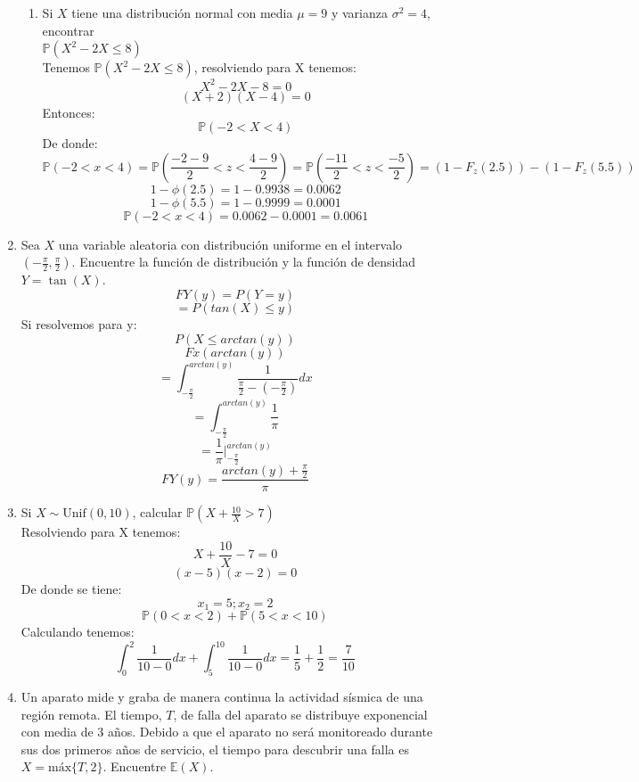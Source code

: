 \documentclass[11pt,a4paper]{report}
\begin{document}
\begin{enumerate}
{\begin{enumerate}
				\item {
					Si $X$ tiene una distribución normal con media $\mu = 9$ y
					varianza $\sigma^2 = 4$, encontrar \\
					$\mathbb{P}(X^2 - 2X \leq 8)$\\
					Tenemos $\mathbb{P}(X^2 - 2X \leq 8)$, resolviendo para X tenemos:
					\[X^2 - 2X - 8 = 0\]
					\[(X + 2) (X - 4) = 0\]
					Entonces:
					\[\mathbb{P}(-2 < X < 4) \]
					De donde:
					\[ \mathbb{P}(-2 < x < 4) = \mathbb{P}(\frac{-2-9}{2} < z < \frac{4-9}{2}) =\mathbb{P}(\frac{-11}{2} < z < \frac{-5}{2}) =  (1 - F_z(2.5)) - (1 - F_z(5.5))\]
					\[  1 - \phi(2.5) = 1 - 0.9938 = 0.0062\]
					\[ 1 - \phi(5.5) = 1 - 0.9999 = 0.0001 \]
					\[\mathbb{P}(-2 < x < 4) = 0.0062 - 0.0001 = 0.0061\]
				}
			\end{enumerate}
		}

		\item{
			Sea $X$ una variable aleatoria con distribución uniforme en el
			intervalo $(-\frac{\pi}{2}, \frac{\pi}{2})$. Encuentre la función de
			distribución y la función de densidad $Y = \tan(X)$.\\
			\[FY(y) = P(Y = y)\]
		\[=P(tan(X) \le y)\]
		Si resolvemos para y:
		\[P(X \le arctan(y))\]
		\[Fx(arctan(y))\]
		\[= \int^{arctan(y)}_{-\frac{\pi}{2}}\frac{1}{\frac{\pi}{2}- (- \frac{\pi}{2})}dx\]
		\[= \int^{arctan(y)}_{-\frac{\pi}{2}} \frac{1}{\pi}\]
		\[=\frac{1}{\pi}|^{arctan(y)}_{-\frac{\pi}{2}}\]
		\[FY(y)=\frac{arctan(y) + \frac{\pi}{2}}{\pi}\]

		}

		\item{
			Si $X \sim \text{Unif}(0, 10)$, calcular
			$\mathbb{P}(X + \frac{10}{X} > 7)$\\
			Resolviendo para X tenemos:
			\[X + \frac{10}{X} - 7 = 0\]
			\[ (x - 5) (x - 2) = 0\]
			De donde se tiene:
			\[x_1 = 5 ; x_2 = 2\]
			\[\mathbb{P}(0 < x < 2) + \mathbb{P}(5 < x <10)\]
			Calculando tenemos:
			\[\int^{2}_{0}\frac{1}{10-0}dx + \int^{10}_{5}\frac{1}{10-0}dx = \frac{1}{5} + \frac{1}{2} = \frac{7}{10}\]

		}


		\item{
			Un aparato mide y graba de manera continua la actividad sísmica de
			una región remota. El tiempo, $T$, de falla del aparato se
			distribuye exponencial con media de 3 años. Debido a que el aparato
			no será monitoreado durante sus dos primeros años de servicio, el
			tiempo para descubrir una falla es $X = \text{máx}\{T,2\}$.
			Encuentre $\mathbb{E}(X)$.

}
\end{enumerate}
\end{document}
